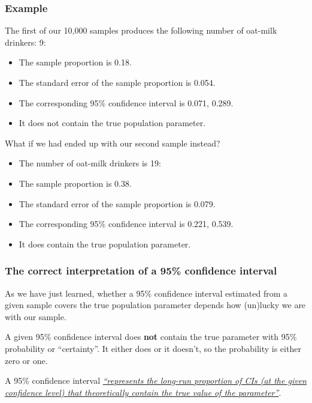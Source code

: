 \documentclass[
  11pt,
]{article}
\providecommand{\tightlist}{%
  \setlength{\itemsep}{0pt}\setlength{\parskip}{0pt}}
\begin{document}
\hypertarget{example}{%
\subsubsection{Example}\label{example}}

The first of our 10,000 samples produces the following number of oat-milk drinkers: 9:

\begin{itemize}
\tightlist
\item
  The sample proportion is 0.18.
\item
  The standard error of the sample proportion is 0.054.
\item
  The corresponding 95\% confidence interval is 0.071, 0.289.
\item
  It does not contain the true population parameter.
\end{itemize}

What if we had ended up with our second sample instead?

\begin{itemize}
\tightlist
\item
  The number of oat-milk drinkers is 19:
\item
  The sample proportion is 0.38.
\item
  The standard error of the sample proportion is 0.079.
\item
  The corresponding 95\% confidence interval is 0.221, 0.539.
\item
  It does contain the true population parameter.
\end{itemize}

\hypertarget{the-correct-interpretation-of-a-95-confidence-interval}{%
\subsubsection{The correct interpretation of a 95\% confidence interval}\label{the-correct-interpretation-of-a-95-confidence-interval}}

As we have just learned, whether a 95\% confidence interval estimated from a given sample covers the true population parameter depends how (un)lucky we are with our sample.

A given 95\% confidence interval does \textbf{not} contain the true parameter with 95\% probability or ``certainty''. It either does or it doesn't, so the probability is either zero or one.

A 95\% confidence interval \href{https://en.wikipedia.org/wiki/Confidence_interval}{\emph{``represents the long-run proportion of CIs (at the given confidence level) that theoretically contain the true value of the parameter''}}.
\end{document}
